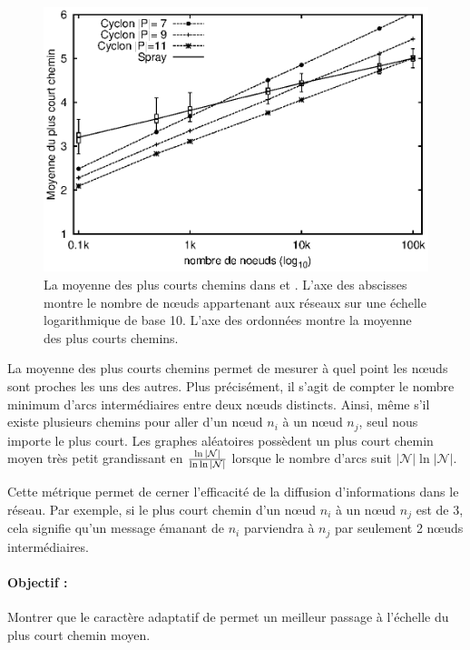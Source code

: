 \begin{figure}
  \centering
  \includegraphics[width=.8\textwidth]{img/spray/avgpath.eps}
  \caption[Plus courts chemins moyens]{\label{net:fig:shortestpath} La moyenne
    des plus courts chemins dans \SPRAY et \CYCLON. L'axe des abscisses montre
    le nombre de nœuds appartenant aux réseaux sur une échelle logarithmique de
    base 10. L'axe des ordonnées montre la moyenne des plus courts chemins.}
\end{figure}

La moyenne des plus courts chemins permet de mesurer à quel point les nœuds sont
proches les uns des autres. Plus précisément, il s'agit de compter le nombre
minimum d'arcs intermédiaires entre deux nœuds distincts. Ainsi, même s'il
existe plusieurs chemins pour aller d'un nœud $n_i$ à un nœud $n_j$, seul nous
importe le plus court.  Les graphes aléatoires possèdent un plus court chemin
moyen très petit grandissant en $\ln|\mathcal{N}|\over\ln\ln|\mathcal{N}|$
lorsque le nombre d'arcs suit $|\mathcal{N}|\ln|\mathcal{N}|$.

Cette métrique permet de cerner l'efficacité de la diffusion d'informations dans
le réseau. Par exemple, si le plus court chemin d'un nœud $n_i$ à un nœud $n_j$
est de 3, cela signifie qu'un message émanant de $n_i$ parviendra à $n_j$ par
seulement 2 nœuds intermédiaires.

\paragraph{Objectif :} Montrer que le caractère adaptatif de \SPRAY permet un
meilleur passage à l'échelle du plus court chemin moyen.

